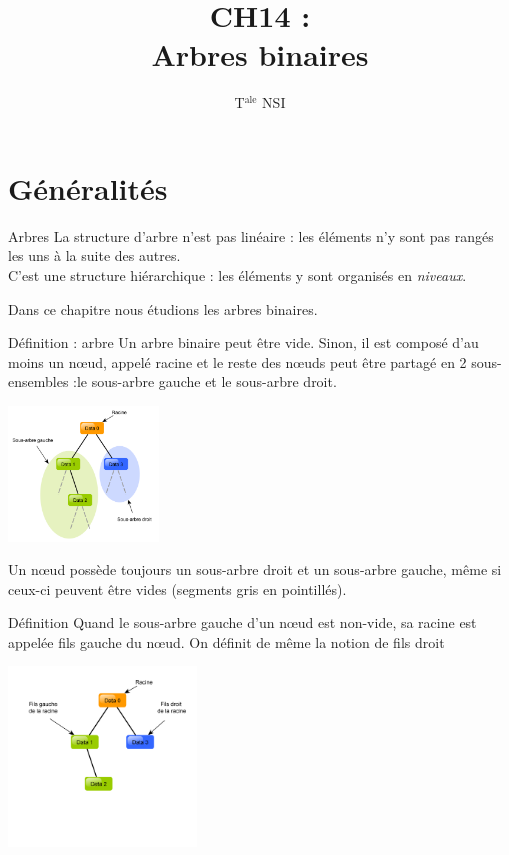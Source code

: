 \documentclass[10pt]{beamer}
\title{CH14 : \\Arbres binaires}
\author{T$^{\text{ale}}$ NSI}
\begin{document}
\maketitle
\section{Généralités}
\begin{frame}{Arbres}
    La structure d'arbre n'est pas linéaire : les éléments n'y sont pas rangés les uns à la suite des autres.\\\pause
     C'est une structure \alert{hiérarchique} : les éléments y sont organisés en \textit{niveaux}.\\\pause
    
    Dans ce chapitre nous étudions les \alert{arbres binaires}.
\end{frame}

\begin{frame}{Définition : arbre}
    Un arbre binaire peut être vide.\pause
    Sinon, il est composé d'au moins un n\oe ud, appelé \alert{racine} et le reste des n\oe uds peut être partagé en 2 sous-ensembles :\pause le \alert{sous-arbre gauche} et le \alert{sous-arbre droit}.\pause
    \begin{center}
        \includegraphics[width=4cm]{img/arbre_bin_1}
    \end{center}\pause
Un n\oe ud possède toujours un sous-arbre droit et un sous-arbre gauche, même si ceux-ci peuvent être vides (segments gris en pointillés).
\end{frame}

\begin{frame}{Définition}
    Quand le sous-arbre gauche d'un n\oe ud est non-vide, sa racine est appelée \alert{fils gauche} du n\oe ud. On définit de même la notion de \alert{fils droit}
    \begin{center}
        \includegraphics[width=5cm]{img/arbre_bin_2}
    \end{center}
\end{frame}
\end{document}
